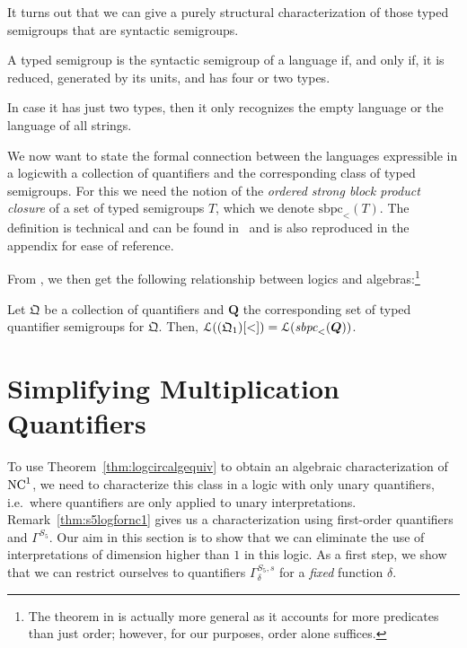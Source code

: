 \documentclass[a4paper,UKenglish,cleveref, autoref, thm-restate, anonymous]{lipics-v2021}
\begin{document}
It turns out that we can give a purely structural characterization of those typed semigroups that are syntactic semigroups.

\begin{proposition}
    A typed semigroup is the syntactic semigroup of a language if, and only if, it is reduced, generated by its units, and has four or two types.

In case it has just two types, then it only recognizes the empty language or the language of all strings.
\end{proposition}

We now want to state the formal connection between the languages expressible in a logicwith a collection of quantifiers and the corresponding class of typed semigroups.  For this we need the notion of the \emph{ordered strong block product closure} of a set of typed semigroups $T$, which we denote $\mathrm{sbpc}_<(T)$.  The definition is technical and can be found in~\cite{krebs2008typed} and is also reproduced in the appendix for ease of reference.

From \cite[Theorem 4.14]{krebs2008typed}, we then get the following relationship between logics and algebras:\footnote{The theorem in \cite{krebs2008typed} is actually more general as it accounts for more predicates than just order; however, for our purposes, order alone suffices.}
\begin{theorem}\label{thm:logcircalgequiv}
     Let $\mathfrak{Q}$ be a collection of quantifiers and $\bm{Q}$ the corresponding set of typed quantifier semigroups for $\mathfrak{Q}$. Then, \(
        \mathcal{L}((\mathfrak{Q}_1)[<]) = \mathcal{L}(\emph{sbpc}_<(\bm{Q}))
    \).
\end{theorem}

\section{Simplifying Multiplication Quantifiers}\label{sec:mult}

To use Theorem~\ref{thm:logcircalgequiv} to obtain an algebraic characterization of $\mathrm{NC}^1$, we need to characterize this class in a logic with only unary quantifiers, i.e.\ where quantifiers are only applied to unary interpretations.  Remark~\ref{thm:s5logfornc1} gives us a characterization using first-order quantifiers and $\Gamma^{S_5}$.  Our aim in this section is to show that we can eliminate the use of interpretations of dimension higher than $1$ in this logic.  As a first step, we show that we can restrict ourselves to quantifiers $\Gamma^{{S_5},s}_{\delta}$ for a \emph{fixed} function $\delta$.
\end{document}
